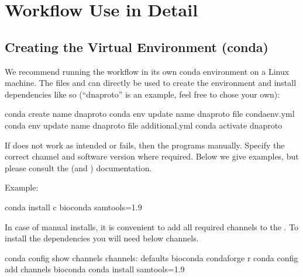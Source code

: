 \documentclass[letterpaper,10pt,english]{sphinxhowto}
\begin{document}
\section{Workflow Use in Detail}
\label{\detokenize{index:workflow-use-in-detail}}

\subsection{Creating the Virtual Environment (conda)}
\label{\detokenize{index:creating-the-virtual-environment-conda}}
We recommend running the workflow in its own conda environment on a Linux machine. The files  and  can directly be used to create the environment and install dependencies like so (“dna\sphinxhyphen{}proto” is an example, feel free to chose your own):

\begin{sphinxVerbatim}[commandchars=\\\{\}]
\PYGZdl{} conda create \PYGZhy{}\PYGZhy{}name dna\PYGZhy{}proto
\PYGZdl{} conda env update \PYGZhy{}\PYGZhy{}name dna\PYGZhy{}proto \PYGZhy{}\PYGZhy{}file condaenv.yml
\PYGZdl{} conda env update \PYGZhy{}\PYGZhy{}name dna\PYGZhy{}proto \PYGZhy{}\PYGZhy{}file additional.yml
\PYGZdl{} conda activate dna\PYGZhy{}proto
\end{sphinxVerbatim}

If  does not work as intended or fails, then  the programs manually. Specify the correct channel and software version where required. Below we give examples, but please consult the  (and ) documentation.

Example:

\begin{sphinxVerbatim}[commandchars=\\\{\}]
\PYGZdl{} conda install \PYGZhy{}c bioconda samtools=1.9
\end{sphinxVerbatim}

In case of manual installs, it is convenient to add all required channels to the . To install the dependencies you will need below channels.

\begin{sphinxVerbatim}[commandchars=\\\{\}]
\PYGZdl{} conda config \PYGZhy{}\PYGZhy{}show channels
channels:
      \PYGZhy{} defaults
      \PYGZhy{} bioconda
      \PYGZhy{} conda\PYGZhy{}forge
      \PYGZhy{} r
\PYGZdl{} conda config \PYGZhy{}\PYGZhy{}add channels bioconda
\PYGZdl{} conda install samtools=1.9
\end{sphinxVerbatim}
\end{document}

